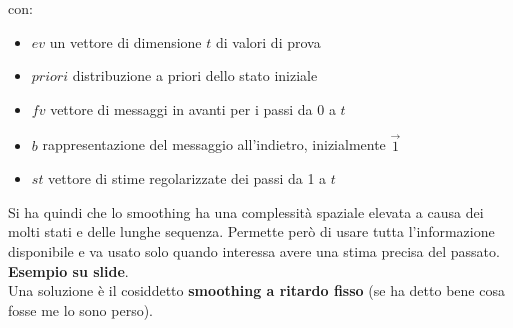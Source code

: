 \documentclass[a4paper,12pt, oneside]{book}
\begin{document}
con:
\begin{itemize}
  \item $ev$ un vettore di dimensione $t$ di valori di prova
  \item $priori$ distribuzione a priori dello stato iniziale
  \item $fv$ vettore di messaggi in avanti per i passi da 0 a $t$
  \item $b$ rappresentazione del messaggio all’indietro, inizialmente $\vec{1}$
  \item $st$ vettore di stime regolarizzate dei passi da 1 a $t$
\end{itemize}
Si ha quindi che lo smoothing ha una complessità spaziale elevata a causa dei
molti stati e delle lunghe sequenza. Permette però di usare tutta l'informazione
disponibile e va usato solo quando interessa avere una stima precisa del
passato.\\
\textbf{Esempio su slide}.\\
Una soluzione è il cosiddetto \textbf{smoothing a ritardo fisso} (se ha detto
bene cosa fosse me lo sono perso).
\end{document}
